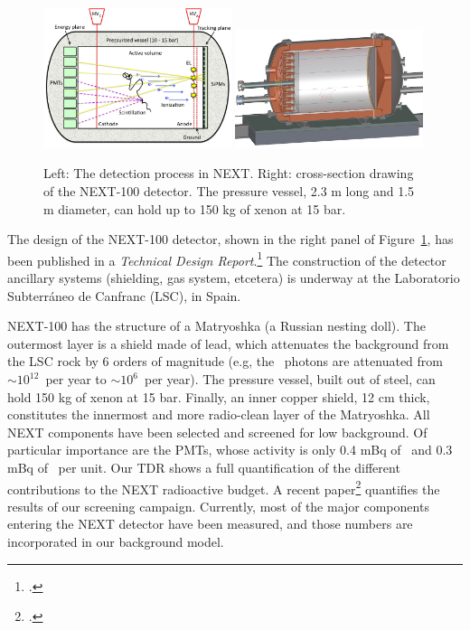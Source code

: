 \begin{figure}
\centering
\includegraphics[width=0.49\textwidth]{img/SOFT.jpg}
\includegraphics[width=0.49\textwidth]{img/NEXT100_full.jpg}
\caption{\small Left: The detection process in NEXT. Right: cross-section drawing of the NEXT-100 detector. The pressure vessel, 2.3 m long and 1.5 m diameter, can hold up to 150 kg of xenon at 15 bar.} \label{fig.SOFT}
\end{figure}


The design of the NEXT-100 detector, shown in the right panel of Figure~\ref{fig.SOFT}, has been published in a \emph{Technical Design Report}.\footcite{Alvarez:2012haa} The construction of the detector ancillary systems (shielding, gas system, etcetera) is underway at the Laboratorio Subterr\'aneo de Canfranc (LSC), in Spain. 

NEXT-100 has the structure of a Matryoshka (a Russian nesting doll). The outermost layer is a shield made of lead, which attenuates the background from the LSC rock by 6 orders of magnitude (e.g, the \TL\ photons are attenuated from $\sim 10^{12}$~per year to $\sim 10^{6}$~per year). The pressure vessel, built out of steel, can hold 150 kg of xenon at 15 bar. Finally, an inner copper shield, 12 cm thick, constitutes the innermost and more radio-clean layer of the Matryoshka. All NEXT components have been selected and screened for low background. Of particular importance are the PMTs, whose activity is only 0.4 mBq of \BI\ and 0.3 mBq of \TL\ per unit. Our TDR shows a full quantification of the different contributions to the NEXT radioactive budget. A recent paper\footcite{Alvarez:2012as} quantifies the results of our screening campaign. Currently, most of the major components entering the NEXT detector have been measured, and those numbers are incorporated in our background model. 


